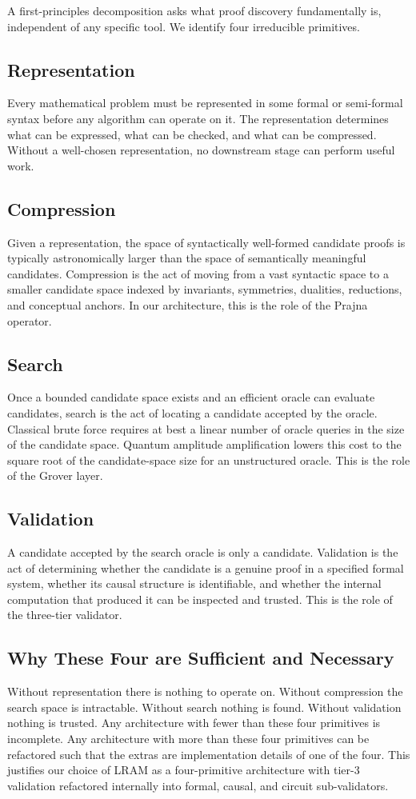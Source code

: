 A first-principles decomposition asks what proof discovery fundamentally is, independent of any specific tool. We identify four irreducible primitives.

\subsection{Representation}
Every mathematical problem must be represented in some formal or semi-formal syntax before any algorithm can operate on it. The representation determines what can be expressed, what can be checked, and what can be compressed. Without a well-chosen representation, no downstream stage can perform useful work.

\subsection{Compression}
Given a representation, the space of syntactically well-formed candidate proofs is typically astronomically larger than the space of semantically meaningful candidates. Compression is the act of moving from a vast syntactic space to a smaller candidate space indexed by invariants, symmetries, dualities, reductions, and conceptual anchors. In our architecture, this is the role of the Prajna operator.

\subsection{Search}
Once a bounded candidate space exists and an efficient oracle can evaluate candidates, search is the act of locating a candidate accepted by the oracle. Classical brute force requires at best a linear number of oracle queries in the size of the candidate space. Quantum amplitude amplification lowers this cost to the square root of the candidate-space size for an unstructured oracle. This is the role of the Grover layer.

\subsection{Validation}
A candidate accepted by the search oracle is only a candidate. Validation is the act of determining whether the candidate is a genuine proof in a specified formal system, whether its causal structure is identifiable, and whether the internal computation that produced it can be inspected and trusted. This is the role of the three-tier validator.

\subsection{Why These Four are Sufficient and Necessary}
Without representation there is nothing to operate on. Without compression the search space is intractable. Without search nothing is found. Without validation nothing is trusted. Any architecture with fewer than these four primitives is incomplete. Any architecture with more than these four primitives can be refactored such that the extras are implementation details of one of the four. This justifies our choice of LRAM as a four-primitive architecture with tier-3 validation refactored internally into formal, causal, and circuit sub-validators.
